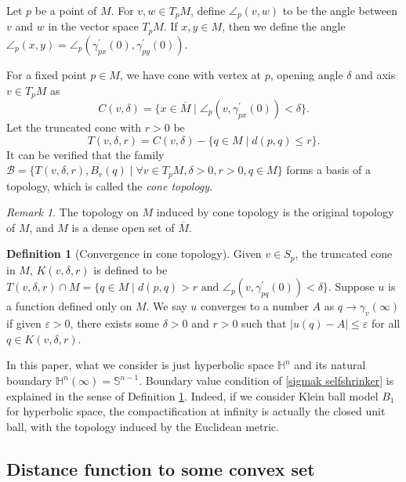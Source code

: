 \documentclass[reqno]{amsart}
\theoremstyle{remark}
\newtheorem{remark}[theorem]{Remark}
\theoremstyle{definition}
\newtheorem{definition}[theorem]{Definition}
\numberwithin{equation}{section}
\begin{document}
Let $p$ be a point of $M$. For $v, w \in T_p{M}$, define $\angle_p(v, w)$ to be the angle between $v$ and $w$ in the vector space $T_p{M}$. If $x, y \in M$, then we define the angle $\angle_p(x, y) = \angle_p(\gamma^{\prime}_{px}(0), \gamma^{\prime}_{py}(0))$.

For a fixed point $p \in M$, we have cone with vertex at $p$, opening angle $\delta$ and axis $v \in T_p{M}$ as 
\[
C(v,\delta) = \{x \in \overline{M} \mid  \angle_{p}(v, \gamma_{px}^{\prime}(0)) < \delta\}.
\]
Let the truncated cone with $r>0$ be
\[
T(v, \delta, r) = C(v, \delta) - \{q \in M \mid d(p,q) \leqslant r\}.
\]
It can be verified that the family $\mathscr{B} = \{T(v, \delta, r), B_{r}(q) \mid \forall v \in T_p{M}, \delta>0, r>0, q\in M \}$ forms a basis of a topology, which is called the \textit{cone topology}.

\begin{remark}
    The topology on $M$ induced by cone topology is the original topology of $M$, and $M$ is a dense open set of $\overline{M}$.
\end{remark}

\begin{definition}[Convergence in cone topology]\label{convergence in cone topology}
Given $v \in S_p$, the truncated cone in $M$, $K(v, \delta, r)$ is defined to be $T(v, \delta, r) \cap M = \{ q \in M \mid d(p, q) > r \text{ and } \angle_{p}(v, \gamma_{pq}^{\prime}(0)) < \delta \}$. Suppose $u$ is a function defined only on $M$. We say $u$ converges to a number $A$ as $q \rightarrow \gamma_v(\infty)$ if given $\varepsilon > 0$, there exists some $\delta > 0$ and $r > 0$ such that $|u(q) - A| \leqslant \varepsilon$ for all $q \in K(v, \delta, r)$.
\end{definition}

In this paper, what we consider is just hyperbolic space $\mathbb{H}^n$ and its natural boundary $\mathbb{H}^n(\infty) = \mathbb{S}^{n-1}$. Boundary value condition of \eqref{sigmak selfshrinker} is explained in the sense of Definition \ref{convergence in cone topology}. Indeed, if we consider Klein ball model $B_1$ for hyperbolic space, the compactification at infinity is actually the closed unit ball, with the topology induced by the Euclidean metric.


\subsection{Distance function to some convex set}
\end{document}
